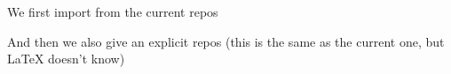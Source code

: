 \documentclass[minimal]{omdoc}
\begin{document}
We first import from the current repos

And then we also give an explicit repos (this is the same as  the current one, but {\LaTeX}
doesn't know)

\end{document}
